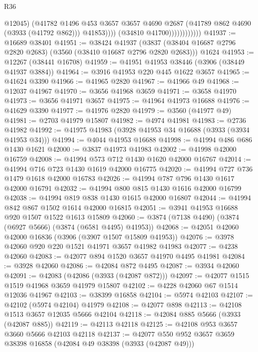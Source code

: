 \begin{lexlean}{R36}
\begin{coremodule}
                                  @12045)
                                (@41782
                                  @1496
                                  @453
                                  @3657
                                  @3657
                                  @4690
                                  @2687
                                  (@41789 @862 @4690 (@3933 (@41792 @862)))
                                  @41853))))
                          (@34810 @41700))))))))))))
@41937 := @16689 @38401
@41951 := @38424
    @41937
    (@3837 (@38404 @16687 @2796 @2820 @2683) (@3560 (@38410 @16687 @2796 @2820 @2683)))
    @1624
@41953 := @12267 (@38441 @16708)
@41959 := @41951 @41953 @38446 (@3906 (@38449 @41937 @3884))
@41964 := @3916 @41953 @220 @445 @1622 @3657
@41965 := @41624 @3390
@41966 := @41965 @2820
@41967 := @41966 @49
@41968 := @12037 @41967
@41970 := @3656 @41968 @3659
@41971 := @3658 @41970
@41973 := @3656 @41971 @3657
@41975 := @41964 @41973 @16688
@41976 := @41629 @3390
@41977 := @41976 @2820
@41979 := @3560 (@41977 @49)
@41981 := @2703 @41979 @15807
@41982 := @4974 @41981
@41983 := @2736 @41982
@41992 := @41975 @41983 (@3928 @41953 @34 @16688 (@3933 (@3934 @41953 @34)))
@41994 := @4044 @41953 @16688
@41998 := @41994 @486 @686 @1430 @1621
@42000 := @3837 @41973 @41983
@42002 := @41998 @42000 @16759
@42008 := @41994 @573 @712 @1430 @1620 @42000 @16767
@42014 := @41994 @716 @723 @1430 @1619 @42000 @16775
@42020 := @41994 @727 @736 @1479 @1618 @42000 @16783
@42026 := @41994 @787 @796 @1430 @1617 @42000 @16791
@42032 := @41994 @800 @815 @1430 @1616 @42000 @16799
@42038 := @41994 @819 @838 @1430 @1615 @42000 @16807
@42044 := @41994 @842 @867 @1502 @1614 @42000 @16815
@42051 := @3941 @41953 @16688 @920 @1507 @1522 @1613 @15809
@42060 := @3874 (@7138 @4490) (@3874 (@6927 @5666) (@3874 (@6581 @4495) @41953))
@42068 := @42051 @42060 @42000 @16836 (@3906 (@3907 @1507 @15809 @41953))
@42076 := @3978 @42060 @920 @220 @1521 @41971 @3657 @41982 @41983
@42077 := @4238 @42060
@42083 := @42077 @894 @1520 @3657 @41970 @4495 @41981
@42084 := @3928 @42060
@42086 := @42084 @872 @4495
@42087 := @3934 @42060
@42091 := @42083 (@42086 (@3933 (@42087 @872)))
@42097 := @42077 @1515 @1519 @41968 @3659 @41979 @15807
@42102 := @4228 @42060 @67 @1514 @12036 @41967
@42103 := @38399 @16858
@42104 := @5974 @42103
@42107 := @42102 (@5974 @42104) @41979
@42108 := @42077 @898
@42113 := @42108 @1513 @3657 @12035 @5666 @42104
@42118 := @42084 @885 @5666 (@3933 (@42087 @885))
@42119 := @42113 @42118
@42125 := @42108 @953 @3657 @3660 @5666 @42103 @42118
@42137 := @42077 @550 @952 @3657 @3659 @38398 @16858 (@42084 @49 @38398 (@3933 (@42087 @49)))

\end{coremodule}
\end{lexlean}
